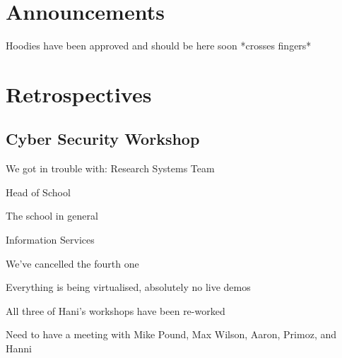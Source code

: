 \documentclass[11pt,hacksoc]{meetingmins}
\begin{document}
\maketitle

\section{Announcements}
\begin{items}
	\item
	Hoodies have been approved and should be here soon *crosses fingers*

\end{items}

\section{Retrospectives}

\subsection{Cyber Security Workshop}
\begin{hiddensubitems}
	\item
	We got in trouble with:
		\subitem
		Research Systems Team
		
		\subitem
		Head of School
		
		\subitem
		The school in general
		
		\subitem
		Information Services
		
	\item
	We've cancelled the fourth one
	
	\item
	Everything is being virtualised, absolutely no live demos
	
	\item
	All three of Hani's workshops have been re-worked
	
	\item
	Need to have a meeting with Mike Pound, Max Wilson, Aaron, Primoz, and Hanni
	
	
	
\end{hiddensubitems}
\end{document}

